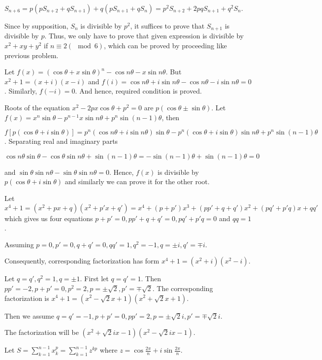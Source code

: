   $S_{n + 6} = p(pS_{n + 2} + qS_{n + 1}) + q(pS_{n + 1} + qS_n) = p^2S_{n + 2} + 2pqS_{n + 1} + q^2S_n$.

  Since by supposition, $S_n$ is divisible by $p^2$, it suffices to prove that $S_{n + 1}$ is divisible by
  $p$. Thus, we only have to prove that given expression is divisible by $x^2 + xy + y^2$ if $n\equiv
  2(\mod 6)$, which can be proved by proceeding like previous problem.
\item Let $f(x) = (\cos\theta + x\sin\theta)^n - \cos n\theta - x\sin n\theta$. But $x^2 + 1 = (x + i)(x -
  i)$ and $f(i) = \cos n\theta + i\sin n\theta - \cos n\theta - i\sin n\theta = 0$. Similarly, $f(-i) =
  0$. And hence, required condition is proved.
\item Roots of the equation $x^2 - 2px\cos\theta + p^2 = 0$ are $p(\cos\theta\pm\sin\theta)$. Let $f(x) =
  x^n\sin\theta - p^{n - 1}x\sin n\theta + p^n\sin(n - 1)\theta$, then

  $f[p(\cos\theta + i\sin\theta)] = p^n(\cos n\theta + i\sin n\theta)\sin\theta - p^n(\cos\theta + i\sin
  \theta)\sin n\theta + p^n\sin(n - 1)\theta$. Separating real and imaginary parts

  $\cos n\theta\sin\theta - \cos\theta\sin n\theta + \sin(n - 1)\theta = -\sin(n - 1)\theta + \sin(n -
  1)\theta = 0$

  and $\sin\theta\sin n\theta - \sin\theta\sin n\theta = 0$. Hence, $f(x)$ is divisible by $p(\cos\theta +
  i\sin\theta)$ and similarly we can prove it for the other root.
\item Let $x^4 + 1 = (x^2 + px + q)(x^2 + p'x + q') = x^4 + (p + p')x^3 + (pp' + q + q')x^2 + (pq' + p'q)x +
  qq'$ which gives us four equations $p + p' = 0, pp' + q + q' = 0, pq' + p'q = 0$ and $qq = 1$.

  Assuming $p = 0, p' = 0, q + q' = 0, qq' = 1, q^2 = -1, q = \pm i, q' = \mp i$.

  Consequently, corresponding factorization has form $x^4 + 1 = (x^2 + i)(x^2 - i)$.

  Let $q = q', q^2 = 1, q = \pm 1$. First let $q = q' = 1$. Then $pp' = -2, p + p' = 0, p^2 = 2, p =
  \pm\sqrt{2}, p' = \mp\sqrt{2}$. The corresponding factorization is $x^4 + 1 = (x^2 - \sqrt{2}x + 1)(x^2 +
  \sqrt{2}x + 1)$.

  Then we assume $q = q' = -1, p + p' = 0, pp' = 2, p = \pm \sqrt{2}i, p' = \mp\sqrt{2}i$.

  The factorization will be $(x^2 + \sqrt{2}ix - 1)(x^2 - \sqrt{2}ix - 1)$.
\item Let $S = \displaystyle\sum_{k = 1}^{n - 1}x_k^p = \sum_{k = 1}^{n - 1}z^{kp}$ where $z =
  \cos\frac{2\pi}{n} + i\sin\frac{2\pi}{n}$.

